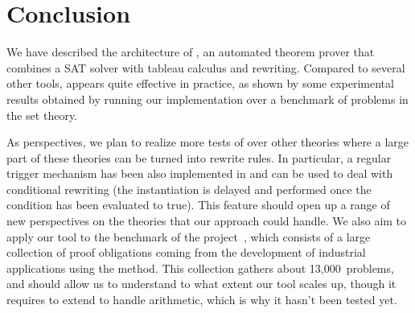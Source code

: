 
\section{Conclusion}

We have described the architecture of \archsat{}, an automated theorem prover
that combines a SAT solver with tableau calculus and rewriting. Compared to
several other tools, \archsat{} appears quite effective in practice, as shown by
some experimental results obtained by running our implementation over a
benchmark of problems in the \bmth{} set theory.

As perspectives, we plan to realize more tests of \archsat{} over other theories
where a large part of these theories can be turned into rewrite rules. In
particular, a regular trigger mechanism has been also implemented in \archsat{}
and can be used to deal with conditional rewriting (the instantiation is delayed
and performed once the condition has been evaluated to true). This feature
should open up a range of new perspectives on the theories that our approach
could handle. We also aim to apply our tool to the benchmark of the \bware{}
project~\cite{BWare}, which consists of a large collection of proof obligations
coming from the development of industrial applications using the \bmth{} method.
This collection gathers about 13,000~problems, and should allow us to understand
to what extent our tool scales up, though it requires to extend \archsat{} to
handle arithmetic, which is why it hasn't been tested yet.
